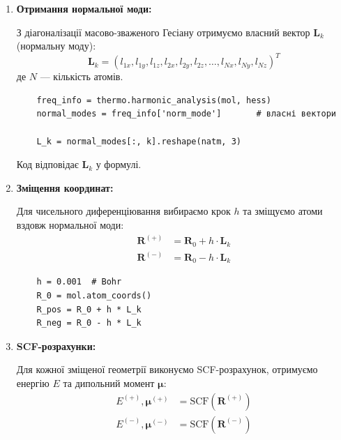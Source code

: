\begin{enumerate}
    \item \textbf{Отримання нормальної моди:}

          З діагоналізації масово-зваженого Гесіану отримуємо власний вектор $\mathbf{L}_k$ (нормальну моду):
          \begin{equation}
              \mathbf{L}_k = (l_{1x}, l_{1y}, l_{1z}, l_{2x}, l_{2y}, l_{2z}, \ldots, l_{Nx}, l_{Ny}, l_{Nz})^T
          \end{equation}
          де $N$ --- кількість атомів.

          \begin{verbatim}
    freq_info = thermo.harmonic_analysis(mol, hess)
    normal_modes = freq_info['norm_mode']       # власні вектори

    L_k = normal_modes[:, k].reshape(natm, 3)
    \end{verbatim}

          Код  відповідає $\mathbf{L}_k$ у формулі.

    \item \textbf{Зміщення координат:}

          Для чисельного диференціювання вибираємо крок $h$ та зміщуємо атоми вздовж нормальної моди:
          \begin{align}
              \mathbf{R}^{(+)} & = \mathbf{R}_0 + h \cdot \mathbf{L}_k \\
              \mathbf{R}^{(-)} & = \mathbf{R}_0 - h \cdot \mathbf{L}_k
          \end{align}

          \begin{verbatim}
    h = 0.001  # Bohr
    R_0 = mol.atom_coords()
    R_pos = R_0 + h * L_k
    R_neg = R_0 - h * L_k
    \end{verbatim}

    \item \textbf{SCF-розрахунки:}

          Для кожної зміщеної геометрії виконуємо SCF-розрахунок, отримуємо енергію $E$ та дипольний момент $\boldsymbol{\mu}$:
          \begin{align}
              E^{(+)}, \boldsymbol{\mu}^{(+)} & = \text{SCF}(\mathbf{R}^{(+)}) \\
              E^{(-)}, \boldsymbol{\mu}^{(-)} & = \text{SCF}(\mathbf{R}^{(-)})
          \end{align}


\end{enumerate}
